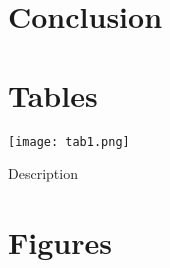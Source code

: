 \documentclass[11pt]{article}
\begin{document}
\section{Conclusion} \label{sec:Conclusion}

\newpage \printbibliography \label{sec:References}

\newpage \section*{Tables} \label{sec:tab}

\begin{table}[hp]
  \centering
  \texttt{[image: tab1.png]}
  \caption{Description}
  \label{tab:1}
\end{table}

\newpage \section*{Figures} \label{sec:fig}
\end{document}
